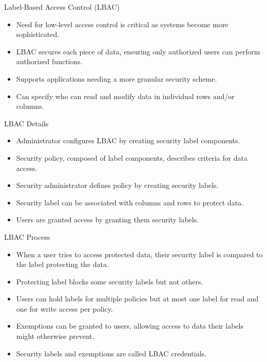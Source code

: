 \documentclass{beamer}
\begin{document}
\begin{frame}{Label-Based Access Control (LBAC)}
    \begin{itemize}
        \item Need for low-level access control is critical as systems become more sophisticated.
        \item LBAC secures each piece of data, ensuring only authorized users can perform authorized functions.
        \item Supports applications needing a more granular security scheme.
        \item Can specify who can read and modify data in individual rows and/or columns.
    \end{itemize}
\end{frame}

\begin{frame}{LBAC Details}
    \begin{itemize}
        \item Administrator configures LBAC by creating security label components.
        \item Security policy, composed of label components, describes criteria for data access.
        \item Security administrator defines policy by creating security labels.
        \item Security label can be associated with columns and rows to protect data.
        \item Users are granted access by granting them security labels.
    \end{itemize}
\end{frame}

\begin{frame}{LBAC Process}
    \begin{itemize}
        \item When a user tries to access protected data, their security label is compared to the label protecting the data.
        \item Protecting label blocks some security labels but not others.
        \item Users can hold labels for multiple policies but at most one label for read and one for write access per policy.
        \item Exemptions can be granted to users, allowing access to data their labels might otherwise prevent.
        \item Security labels and exemptions are called LBAC credentials.
    \end{itemize}
\end{frame}
\end{document}

